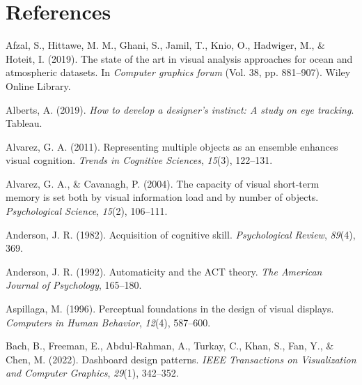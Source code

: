 \documentclass[print]{nuthesis}
\newlength{\cslhangindent}
\newenvironment{CSLReferences}[2]%
{\setlength{\parindent}{0pt}%
\everypar{\setlength{\hangindent}{\cslhangindent}}\ignorespaces}%
{\par}
\begin{document}
\backmatter

\hypertarget{references}{%
\chapter*{References}\label{references}}

\noindent

\setlength{\parindent}{-0.20in}
\setlength{\leftskip}{0.20in}
\setlength{\parskip}{8pt}

\hypertarget{refs}{}
\begin{CSLReferences}{1}{0}
\leavevmode{}%
Afzal, S., Hittawe, M. M., Ghani, S., Jamil, T., Knio, O., Hadwiger, M., \& Hoteit, I. (2019). The state of the art in visual analysis approaches for ocean and atmospheric datasets. In \emph{Computer graphics forum} (Vol. 38, pp. 881--907). Wiley Online Library.

\leavevmode{}%
Alberts, A. (2019). \emph{How to develop a designer's instinct: A study on eye tracking}. Tableau.

\leavevmode{}%
Alvarez, G. A. (2011). Representing multiple objects as an ensemble enhances visual cognition. \emph{Trends in Cognitive Sciences}, \emph{15}(3), 122--131.

\leavevmode{}%
Alvarez, G. A., \& Cavanagh, P. (2004). The capacity of visual short-term memory is set both by visual information load and by number of objects. \emph{Psychological Science}, \emph{15}(2), 106--111.

\leavevmode{}%
Anderson, J. R. (1982). Acquisition of cognitive skill. \emph{Psychological Review}, \emph{89}(4), 369.

\leavevmode{}%
Anderson, J. R. (1992). Automaticity and the ACT theory. \emph{The American Journal of Psychology}, 165--180.

\leavevmode{}%
Aspillaga, M. (1996). Perceptual foundations in the design of visual displays. \emph{Computers in Human Behavior}, \emph{12}(4), 587--600.

\leavevmode{}%
Bach, B., Freeman, E., Abdul-Rahman, A., Turkay, C., Khan, S., Fan, Y., \& Chen, M. (2022). Dashboard design patterns. \emph{IEEE Transactions on Visualization and Computer Graphics}, \emph{29}(1), 342--352.


\end{CSLReferences}
\end{document}
